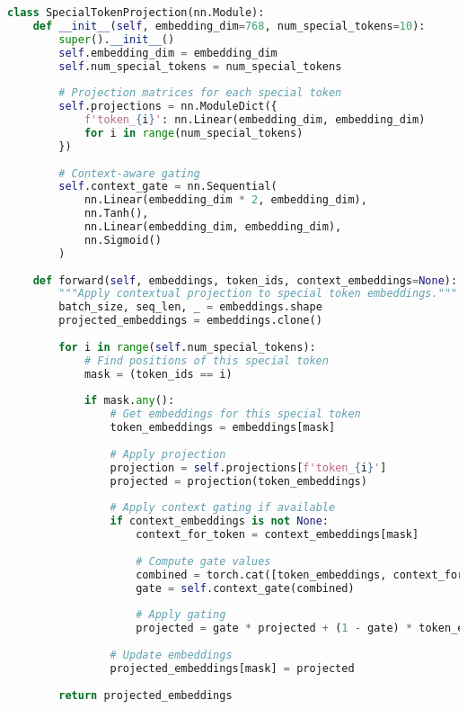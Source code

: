 \begin{lstlisting}[language=Python, caption=Contextual projection of special token embeddings]
class SpecialTokenProjection(nn.Module):
    def __init__(self, embedding_dim=768, num_special_tokens=10):
        super().__init__()
        self.embedding_dim = embedding_dim
        self.num_special_tokens = num_special_tokens
        
        # Projection matrices for each special token
        self.projections = nn.ModuleDict({
            f'token_{i}': nn.Linear(embedding_dim, embedding_dim)
            for i in range(num_special_tokens)
        })
        
        # Context-aware gating
        self.context_gate = nn.Sequential(
            nn.Linear(embedding_dim * 2, embedding_dim),
            nn.Tanh(),
            nn.Linear(embedding_dim, embedding_dim),
            nn.Sigmoid()
        )
        
    def forward(self, embeddings, token_ids, context_embeddings=None):
        """Apply contextual projection to special token embeddings."""
        batch_size, seq_len, _ = embeddings.shape
        projected_embeddings = embeddings.clone()
        
        for i in range(self.num_special_tokens):
            # Find positions of this special token
            mask = (token_ids == i)
            
            if mask.any():
                # Get embeddings for this special token
                token_embeddings = embeddings[mask]
                
                # Apply projection
                projection = self.projections[f'token_{i}']
                projected = projection(token_embeddings)
                
                # Apply context gating if available
                if context_embeddings is not None:
                    context_for_token = context_embeddings[mask]
                    
                    # Compute gate values
                    combined = torch.cat([token_embeddings, context_for_token], dim=-1)
                    gate = self.context_gate(combined)
                    
                    # Apply gating
                    projected = gate * projected + (1 - gate) * token_embeddings
                    
                # Update embeddings
                projected_embeddings[mask] = projected
                
        return projected_embeddings
\end{lstlisting}


